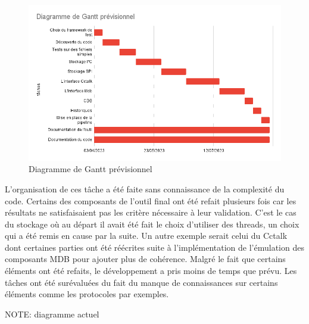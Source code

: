 \documentclass[a4paper]{article}
\begin{document}
\begin{figure}[h!]
  \begin{center}
  \includegraphics[scale=0.6]{./img/expected-gantt.png}
  \caption{Diagramme de Gantt prévisionnel}
  \end{center}
\end{figure}

L'organisation de ces tâche a été faite sans connaissance de la complexité du
code. Certains des composants de l'outil final ont été refait plusieurs fois car
les résultats ne satisfaisaient pas les critère nécessaire à leur validation.
C'est le cas du stockage où au départ il avait été fait le choix d'utiliser des
threads, un choix qui a été remis en cause par la suite. Un autre exemple serait
celui du Cctalk dont certaines parties ont été réécrites suite à
l'implémentation de l'émulation des composants MDB pour ajouter plus de
cohérence. Malgré le fait que certains éléments ont été refaits, le
développement a pris moins de temps que prévu. Les tâches ont été surévaluées du
fait du manque de connaissances sur certains éléments comme les protocoles par
exemples.

NOTE: diagramme actuel
\end{document}
